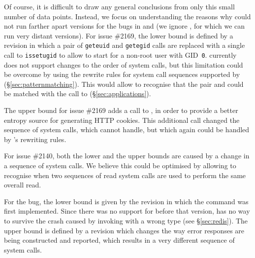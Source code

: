 Of course, it is difficult to draw any general conclusions from only
this small number of data points.  Instead, we focus on understanding
the reasons why \mx could not run farther apart versions for the bugs
in \lighttpd and \redis (we ignore \coreutils, for which we can run
very distant versions).
%
For \lighttpd issue \#2169, the lower bound is defined by a revision
in which a pair of \lstinline`geteuid` and \lstinline`getegid` calls
are replaced with a single call to \lstinline`issetugid` to
allow \lighttpd to start for a non-root user with GID~\lstinline`0`. \mx 
currently does not support changes to the order of system calls, but
this limitation could be overcome by using the rewrite rules for system call
sequences supported  by \varan (\S\ref{sec:patternmatching}). This would
allow \mx to recognise that the pair  and
 could be matched with the call to
 (\S\ref{sec:applications}).

The upper bound for \lighttpd issue \#2169 adds a  call to
, in order to provide a better entropy source for
generating HTTP cookies.  This additional  call changed the
sequence of system calls, which \mx cannot handle, but which again could be
handled by \varan's rewriting rules.

For \lighttpd issue \#2140, both the lower and the upper bounds are
caused by a change in a sequence of  system calls.  We
believe this could be optimised by allowing \mx to recognise when two
sequences of read system calls are used to perform the same overall
read.


For the \redis bug, the lower bound is given by the revision in which the
 command was first implemented.  Since there was no support for
 before that version, \mx has no way to survive the crash caused
by invoking  with a wrong type (see \S\ref{sec:redis}).  The
upper bound is defined by a revision which changes the way error responses are
being constructed and reported, which results in a very different sequence of
system calls.


